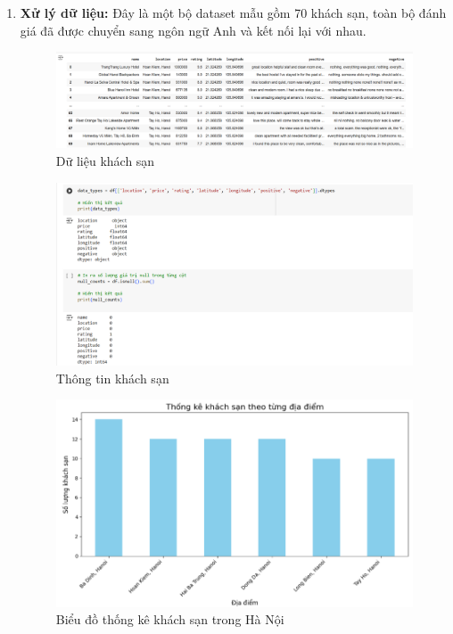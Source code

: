 \begin{enumerate}
    \item \textbf{Xử lý dữ liệu:}
    Đây là một bộ dataset mẫu gồm 70 khách sạn, toàn bộ đánh giá đã được chuyển sang ngôn ngữ Anh và kết nối lại với nhau.

    \begin{figure}[H]
        \centering
        \includegraphics[width=1\linewidth]{Figures/8.1.png}
        \caption{Dữ liệu khách sạn}
        \label{fig:enter-label}
    \end{figure}

    \begin{figure}[H]
        \centering
        \includegraphics[width=1\linewidth]{Figures/8.2.png}
        \caption{Thông tin khách sạn}
        \label{fig:enter-label}
    \end{figure}

     \begin{figure}[H]
        \centering
        \includegraphics[width=1\linewidth]{Figures/8.3.png}
        \caption{Biểu đồ thống kê khách sạn trong Hà Nội}
        \label{fig:enter-label}
    \end{figure}


\end{enumerate}
